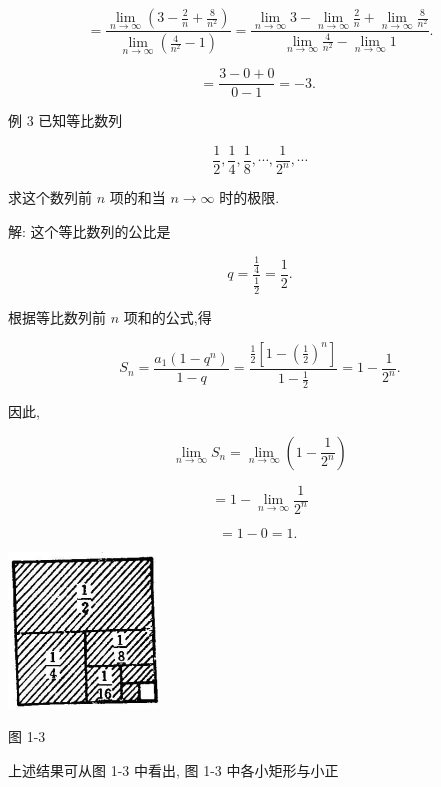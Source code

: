 \documentclass[10pt]{article}
\begin{document}
\[
= \frac{\mathop{\lim }\limits_{{n \rightarrow \infty }}\left( {3 - \frac{2}{n} + \frac{8}{{n}^{2}}}\right) }{\mathop{\lim }\limits_{{n \rightarrow \infty }}\left( {\frac{4}{{n}^{2}} - 1}\right) } = \frac{\mathop{\lim }\limits_{{n \rightarrow \infty }}3 - \mathop{\lim }\limits_{{n \rightarrow \infty }}\frac{2}{n} + \mathop{\lim }\limits_{{n \rightarrow \infty }}\frac{8}{{n}^{2}}}{\mathop{\lim }\limits_{{n \rightarrow \infty }}\frac{4}{{n}^{2}} - \mathop{\lim }\limits_{{n \rightarrow \infty }}1}.
\]

\[
= \frac{3 - 0 + 0}{0 - 1} = - 3\text{. }
\]

例 3 已知等比数列

\[
\frac{1}{2},\frac{1}{4},\frac{1}{8},\cdots ,\frac{1}{{2}^{n}},\cdots
\]

求这个数列前 \(n\) 项的和当 \(n \rightarrow \infty\) 时的极限.

解: 这个等比数列的公比是

\[
q = \frac{\frac{1}{4}}{\frac{1}{2}} = \frac{1}{2}.
\]

根据等比数列前 \(n\) 项和的公式,得

\[
{S}_{n} = \frac{{a}_{1}\left( {1 - {q}^{n}}\right) }{1 - q} = \frac{\frac{1}{2}\left\lbrack {1 - {\left( \frac{1}{2}\right) }^{n}}\right\rbrack }{1 - \frac{1}{2}} = 1 - \frac{1}{{2}^{n}}.
\]

因此,

\[
\mathop{\lim }\limits_{{n \rightarrow \infty }}{S}_{n} = \mathop{\lim }\limits_{{n \rightarrow \infty }}\left( {1 - \frac{1}{{2}^{n}}}\right)
\]

\[
= 1 - \mathop{\lim }\limits_{{n \rightarrow \infty }}\frac{1}{{2}^{n}}
\]

\[
= 1 - 0 = 1\text{. }
\]

\begin{center}
\includegraphics[max width=0.3\textwidth]{images/01912c18-5c3f-733d-b775-749ba9897a9d_14_791114.jpg}
\end{center}

图 1-3

上述结果可从图 1-3 中看出, 图 1-3 中各小矩形与小正
\end{document}
